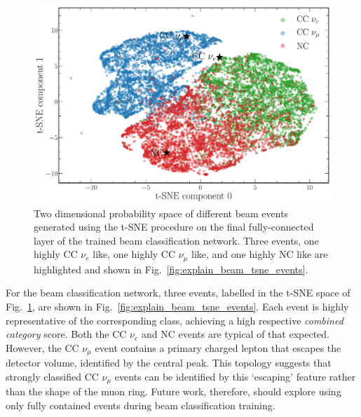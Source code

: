 \begin{figure} %
    \includegraphics[width=\textwidth]{diagrams/7-results/explain_beam_tsne.pdf}
    \caption[Beam classification network output t-SNE space]
    {Two dimensional probability space of different beam events generated using the t-SNE
        procedure on the final fully-connected layer of the trained beam classification network.
        Three events, one highly CC $\nu_{e}$ like, one highly CC $\nu_{\mu}$ like, and one highly
        NC like are highlighted and shown in Fig.~\ref{fig:explain_beam_tsne_events}.}
    \label{fig:explain_beam_tsne}
\end{figure}

For the beam classification network, three events, labelled in the t-SNE space of
Fig.~\ref{fig:explain_beam_tsne}, are shown in Fig.~\ref{fig:explain_beam_tsne_events}. Each event
is highly representative of the corresponding class, achieving a high respective \emph{combined
category} score. Both the CC $\nu_{e}$ and NC events are typical of that expected. However, the CC
$\nu_{\mu}$ event contains a primary charged lepton that escapes the detector volume, identified
by the central peak. This topology suggests that strongly classified CC $\nu_{\mu}$ events can be
identified by this `escaping' feature rather than the shape of the muon ring. Future work,
therefore, should explore using only fully contained events during beam classification training.

